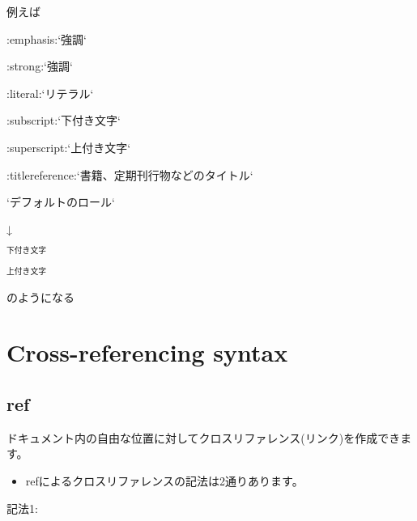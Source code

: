 \documentclass[letterpaper,10pt,dvipdfmx,openany,oneside]{sphinxmanual}
\begin{document}
%
\begin{sphinxVerbatim}[commandchars=\\\{\}]
  
\end{sphinxVerbatim}

例えば

%
\begin{sphinxVerbatim}[commandchars=\\\{\}]
:emphasis:{}`強調{}`

:strong:{}`強調{}`

:literal:{}`リテラル{}`

:subscript:{}`下付き文字{}`

:superscript:{}`上付き文字{}`

:title\PYGZhy{}reference:{}`書籍、定期刊行物などのタイトル{}`

{}`デフォルトのロール{}`
\end{sphinxVerbatim}

↓




$_{\text{下付き文字}}$

$^{\text{上付き文字}}$



のようになる


\section{Cross-referencing syntax}
\label{\detokenize{source/1.chapter/roles:cross-referencing-syntax}}

\subsection{ref}
\label{\detokenize{source/1.chapter/roles:ref}}
ドキュメント内の自由な位置に対してクロスリファレンス(リンク)を作成できます。
\begin{itemize}
\item {} 
refによるクロスリファレンスの記法は2通りあります。

\end{itemize}

記法1:
\end{document}
